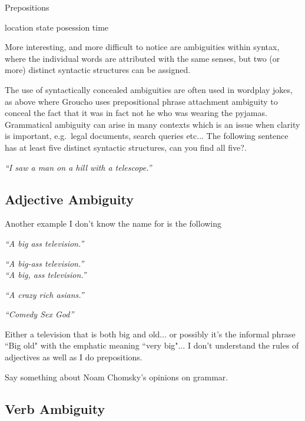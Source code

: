 Prepositions

location
state
posession
time

More interesting, and more difficult to notice are ambiguities within syntax, where the individual words are attributed with the same senses, but two (or more) distinct syntactic structures can be assigned.

The use of syntactically concealed ambiguities are often used in wordplay jokes, as above where Groucho uses prepositional phrase attachment ambiguity to conceal the fact that it was in fact not he who was wearing the pyjamas. Grammatical ambiguity can arise in many contexts which is an issue when clarity is important, e.g.\ legal documents, search queries etc... The following sentence has at least five distinct syntactic structures, can you find all five?. 

\begin{center}
	\textit{``I saw a man on a hill with a telescope.''}
\end{center}

\subsection{Adjective Ambiguity}

Another example I don't know the name for is the following

\begin{center}
	\textit{``A big ass television.''}
\end{center}

\begin{center}
	\textit{``A big-ass television.''\\ ``A big, ass television.''}
\end{center}

\begin{center}
	\textit{``A crazy rich asians.''}
\end{center}

\begin{center}
	\textit{``Comedy Sex God''}
\end{center}

Either a television that is both big and old... or possibly it's the informal phrase ``Big old" with the emphatic meaning ``very big"... I don't understand the rules of adjectives as well as I do prepositions.

Say something about Noam Chomsky's opinions on grammar.

\subsection{Verb Ambiguity}

